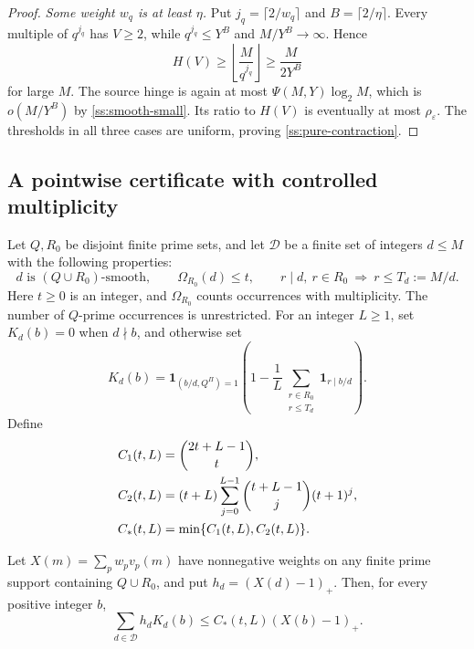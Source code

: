 \begin{proof}
\emph{Some weight $w_q$ is at least $\eta$.}
Put $j_q=\lceil2/w_q\rceil$ and $B=\lceil2/\eta\rceil$.
Every multiple of $q^{j_q}$ has $V\ge2$, while
$q^{j_q}\le Y^B$ and $M/Y^B\to\infty$. Hence
\[
 H(V)\ge\left\lfloor\frac M{q^{j_q}}\right\rfloor
 \ge\frac M{2Y^B}
\]
for large $M$. The source hinge is again at most
$\Psi(M,Y)\log_2M$, which is $o(M/Y^B)$ by
\eqref{ss:smooth-small}. Its ratio to $H(V)$ is eventually at most
$\rho_\varepsilon$.
The thresholds in all three cases are uniform, proving
\eqref{ss:pure-contraction}.
\end{proof}

\subsection{A pointwise certificate with controlled multiplicity}

Let $Q,R_0$ be disjoint finite prime sets, and let $\mathcal D$ be a finite
set of integers $d\le M$ with the following properties:
\[
 d\text{ is }(Q\cup R_0)\text{-smooth},\qquad
 \Omega_{R_0}(d)\le t,\qquad
 r\mid d,\ r\in R_0\ \Longrightarrow\ r\le T_d:=M/d.
 \tag{D}
\]
Here $t\ge0$ is an integer, and $\Omega_{R_0}$ counts occurrences with
multiplicity. The number of $Q$-prime occurrences is unrestricted.
For an integer $L\ge1$, set $K_d(b)=0$ when $d\nmid b$, and otherwise set
\begin{equation}
 K_d(b)=\mathbf1_{(b/d,Q^\Pi)=1}
       \left(1-\frac1L
          \sum_{\substack{r\in R_0\\r\le T_d}}\mathbf1_{r\mid b/d}\right).
 \label{ss:discounted}
\end{equation}
Define
\begin{align}
 C_1(t,L)&=\binom{2t+L-1}{t},\notag\\
 C_2(t,L)&=(t+L)\sum_{j=0}^{L-1}
                  \binom{t+L-1}{j}(t+1)^j,\notag\\
 C_*(t,L)&=\min\{C_1(t,L),C_2(t,L)\}.
 \label{ss:multiplicity}
\end{align}

\begin{lemma}
\label{ss:capacity}
Let $X(m)=\sum_pw_pv_p(m)$ have nonnegative weights on any finite prime
support containing $Q\cup R_0$, and put $h_d=(X(d)-1)_+$.
Then, for every positive integer $b$,
\begin{equation}
 \sum_{d\in\mathcal D}h_dK_d(b)
 \le C_*(t,L)(X(b)-1)_+.
 \label{ss:pointwise}
\end{equation}
\end{lemma}

